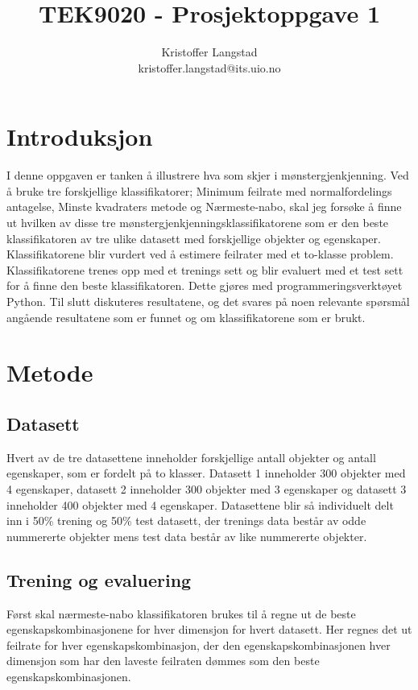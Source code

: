\documentclass[twocolumn,norwegian]{article}
\title{TEK9020 - Prosjektoppgave 1}
\author{Kristoffer Langstad \\ kristoffer.langstad@its.uio.no}
\date{}
\begin{document}
\maketitle

\section{Introduksjon}
I denne oppgaven er tanken å illustrere hva som skjer i mønstergjenkjenning. Ved å bruke tre forskjellige klassifikatorer; Minimum feilrate med normalfordelings antagelse, Minste kvadraters metode og Nærmeste-nabo, skal jeg forsøke å finne ut hvilken av disse tre mønstergjenkjenningsklassifikatorene som er den beste klassifikatoren av tre ulike datasett med forskjellige objekter og egenskaper. Klassifikatorene blir vurdert ved å estimere feilrater med et to-klasse problem. Klassifikatorene trenes opp med et trenings sett og blir evaluert med et test sett for å finne den beste klassifikatoren. Dette gjøres med programmeringsverktøyet Python. Til slutt diskuteres resultatene, og det svares på noen relevante spørsmål angående resultatene som er funnet og om klassifikatorene som er brukt.


\section{Metode}
\subsection{Datasett}
Hvert av de tre datasettene inneholder forskjellige antall objekter og antall egenskaper, som er fordelt på to klasser. Datasett 1 inneholder 300 objekter med 4 egenskaper, datasett 2 inneholder 300 objekter med 3 egenskaper og datasett 3 inneholder 400 objekter med 4 egenskaper. Datasettene blir så individuelt delt inn i 50\% trening og 50\% test datasett, der trenings data består av odde nummererte objekter mens test data består av like nummererte objekter.

\subsection{Trening og evaluering}
Først skal nærmeste-nabo klassifikatoren brukes til å regne ut de beste egenskapskombinasjonene for hver dimensjon for hvert datasett. Her regnes det ut feilrate for hver egenskapskombinasjon, der den egenskapskombinasjonen hver dimensjon som har den laveste feilraten dømmes som den beste egenskapskombinasjonen. 
\end{document}
